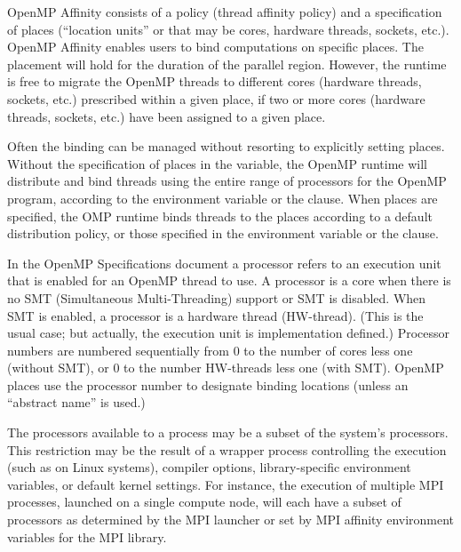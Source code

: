 \label{chap:openmp_affinity}

OpenMP Affinity consists of a  policy (thread affinity policy) and a specification of
places (``location units'' or  that may be cores, hardware
threads, sockets, etc.).  
OpenMP Affinity enables users to bind computations on specific places.
The placement will hold for the duration of the parallel region. 
However, the runtime is free to migrate the OpenMP threads 
to different cores (hardware threads, sockets, etc.) prescribed within a given place, 
if two or more cores (hardware threads, sockets, etc.) have been assigned to a given place.

Often the binding can be managed without resorting to explicitly setting places.
Without the specification of places in the  variable, 
the OpenMP runtime will distribute and bind threads using the entire range of processors for 
the OpenMP program, according to the  environment variable
or the  clause.  When places are specified, the OMP runtime
binds threads to the places according to a default distribution policy, or
those specified in the  environment variable or the
 clause.

In the OpenMP Specifications document a processor refers to an execution unit that
is enabled for an OpenMP thread to use.  A processor is a core when there is
no SMT (Simultaneous Multi-Threading) support or SMT is disabled.  When 
SMT is enabled, a processor is a hardware thread (HW-thread). (This is the
usual case; but actually, the execution unit is implementation defined.) Processor
numbers are numbered sequentially from 0 to the number of cores less one (without SMT), or
0 to the number HW-threads less one (with SMT). OpenMP places use the processor number to designate
binding locations (unless an ``abstract name'' is used.) 


The processors available to a process may be a subset of the system's
processors.  This restriction may be the result of a 
wrapper process controlling the execution (such as  on Linux systems), 
compiler options, library-specific environment variables, or default
kernel settings.  For instance, the execution of multiple MPI processes,
launched on a single compute node, will each have a subset of processors as
determined by the MPI launcher or set by MPI affinity environment 
variables for the MPI library.  %

